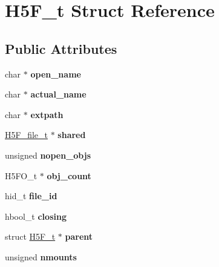 \hypertarget{struct_h5_f__t}{}\section{H5\+F\+\_\+t Struct Reference}
\label{struct_h5_f__t}
\subsection*{Public Attributes}
\begin{DoxyCompactItemize}
\item 
\mbox{\label{struct_h5_f__t_af2e7e8238f1f1622dea83916fd2fd4bf}} 
char $\ast$ {\bfseries open\+\_\+name}
\item 
\mbox{\label{struct_h5_f__t_a0d8ff6b44cb07b52efe986c64a56d8e5}} 
char $\ast$ {\bfseries actual\+\_\+name}
\item 
\mbox{\label{struct_h5_f__t_a65b90e3c812def3966d7358664c3888a}} 
char $\ast$ {\bfseries extpath}
\item 
\mbox{\label{struct_h5_f__t_a9717068a67ec539a7b0f52dba6e0bc66}} 
\hyperlink{struct_h5_f__file__t}{H5\+F\+\_\+file\+\_\+t} $\ast$ {\bfseries shared}
\item 
\mbox{\label{struct_h5_f__t_a98a6becd6da5f519afc68c31b2c00c22}} 
unsigned {\bfseries nopen\+\_\+objs}
\item 
\mbox{\label{struct_h5_f__t_ae69d8aa6067c1212502465de6d33b2df}} 
H5\+F\+O\+\_\+t $\ast$ {\bfseries obj\+\_\+count}
\item 
\mbox{\label{struct_h5_f__t_a4e280750295cfa5f8eeef6518b55889a}} 
hid\+\_\+t {\bfseries file\+\_\+id}
\item 
\mbox{\label{struct_h5_f__t_aea94488ae2b47eb25743115076f8ea27}} 
hbool\+\_\+t {\bfseries closing}
\item 
\mbox{\label{struct_h5_f__t_a91e8020f02c7057a139759e1e8187736}} 
struct \hyperlink{struct_h5_f__t}{H5\+F\+\_\+t} $\ast$ {\bfseries parent}
\item 
\mbox{\label{struct_h5_f__t_afe8393ed96ff07f72149dbd0e75885b3}} 
unsigned {\bfseries nmounts}
\end{DoxyCompactItemize}


